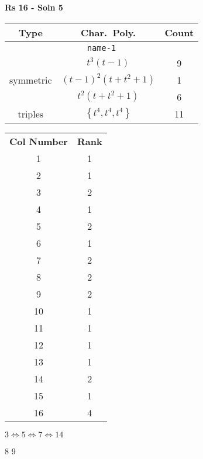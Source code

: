 \documentclass{article}
\begin{document}
    \textbf{Rs 16 - Soln 5}
    \begin{table}
    \begin{tabular}{|c|c|c|}
    \hline
    \textbf{Type} & \textbf{Char.~Poly.} & \textbf{Count} \\
    \hline \multicolumn{3}{|c|}{\texttt{name-1}} \\ \hline
    \multirow{3}{*}{symmetric}
    & $t^3(t - 1)$ & 9 \\
    & $(t - 1)^2(t + t^2 + 1)$ & 1 \\
    & $t^2(t + t^2 + 1)$ & 6 \\
    \hline
    \multirow{1}{*}{triples}
    & $\left\{t^4,t^4,t^4\right\}$ & 11 \\
    \hline
    \end{tabular}
    \end{table}
    \begin{table}
    \begin{tabular}{|c|c|}
    \hline
    \textbf{Col Number} & \textbf{Rank}\\
    1 & 1 \\ 
    2 & 1 \\ 
    3 & 2 \\ 
    4 & 1 \\ 
    5 & 2 \\ 
    6 & 1 \\ 
    7 & 2 \\ 
    8 & 2 \\ 
    9 & 2 \\ 
    10 & 1 \\ 
    11 & 1 \\ 
    12 & 1 \\ 
    13 & 1 \\ 
    14 & 2 \\ 
    15 & 1 \\ 
    16 & 4 \\ 
    \hline
    \end{tabular}
    \end{table}

    $3 \Leftrightarrow 5 \Leftrightarrow 7 \Leftrightarrow 14$
    
    8 9
    \newpage
\end{document}
